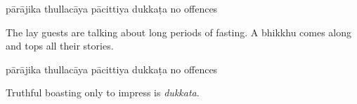 \begin{exam}{\autoExamName}
\begin{problem*}
\begin{parts}
  \bigskip

  \begin{answers}{5}
    \bChoices
     pārājika\eAns
     thullacāya\eAns
     pācittiya\eAns
     dukkaṭa\eAns
     no offences\eAns
    \eChoices
  \end{answers}

  \bigskip

\item The lay guests are talking about long periods of fasting. A bhikkhu comes
  along and tops all their stories.

  \bigskip

  \begin{answers}{5}
    \bChoices
     pārājika\eAns
     thullacāya\eAns
     pācittiya\eAns
     dukkaṭa\eAns
     no offences\eAns
    \eChoices
  \end{answers}

  \begin{solution}
    Truthful boasting only to impress is \emph{dukkata}.
  \end{solution}

\end{parts}

\end{problem*}

\end{exam}
